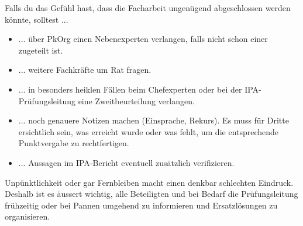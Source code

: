 Falls du das Gefühl hast, dass die Facharbeit ungenügend abgeschlossen werden könnte, solltest ...
\begin{itemize}
  \item ... über PkOrg einen Nebenexperten verlangen, falls nicht schon einer zugeteilt ist.
  \item ... weitere Fachkräfte um Rat fragen.
  \item ... in besonders heiklen Fällen beim Chefexperten oder bei der IPA-Prüfungsleitung eine Zweitbeurteilung verlangen.
  \item ... noch genauere Notizen machen (Einsprache, Rekurs). Es muss für Dritte ersichtlich sein, was erreicht wurde oder was fehlt, um die entsprechende Punktvergabe zu rechtfertigen.
  \item ... Aussagen im IPA-Bericht eventuell zusätzlich verifizieren.
\end{itemize}

Unpünktlichkeit oder gar Fernbleiben macht einen denkbar schlechten Eindruck. Deshalb ist es äussert wichtig, alle Beteiligten und bei Bedarf die Prüfungsleitung frühzeitig oder bei Pannen umgehend zu informieren und Ersatzlösungen zu organisieren.